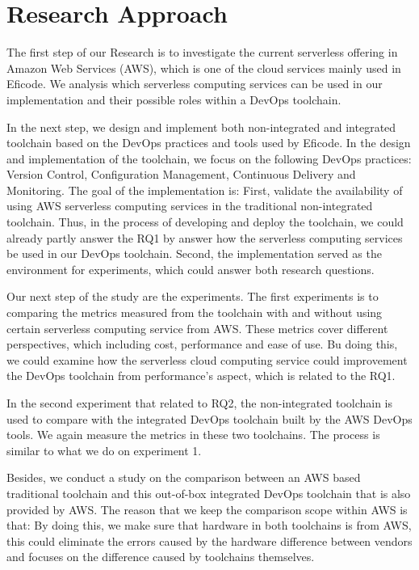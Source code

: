 \section{Research Approach} 
\par
The first step of our Research is to investigate the current serverless offering in Amazon Web Services (AWS), which is one of the cloud services mainly used in Eficode. We analysis which serverless computing services can be used in our implementation and their possible roles within a DevOps toolchain.
\par
In the next step, we design and implement both non-integrated and integrated toolchain based on the DevOps practices and tools used by Eficode. In the design and implementation of the toolchain, we focus on the following DevOps practices: Version Control, Configuration Management, Continuous Delivery and Monitoring. The goal of the implementation is: First, validate the availability of using AWS serverless computing services in the traditional non-integrated toolchain. Thus, in the process of developing and deploy the toolchain, we could already partly answer the RQ1 by answer how the serverless computing services be used in our DevOps toolchain. Second, the implementation served as the environment for experiments, which could answer both research questions. 
\par
Our next step of the study are the experiments.
The first experiments is to comparing the metrics measured from the toolchain with and without using certain serverless computing service from AWS. These metrics cover different perspectives, which including cost, performance and ease of use. Bu doing this, we could examine how the serverless cloud computing service could improvement the DevOps toolchain from performance's aspect, which is related to the RQ1.
\par
In the second experiment that related to RQ2, the non-integrated toolchain is used to compare with the integrated DevOps toolchain built by the AWS DevOps tools. We again measure the metrics in these two toolchains. The process is similar to what we do on experiment 1.
\par
Besides, we conduct a study on the comparison between an AWS based traditional toolchain and this out-of-box integrated DevOps toolchain that is also provided by AWS. The reason that we keep the comparison scope within AWS is that: By doing this, we make sure that hardware in both toolchains is from AWS, this could eliminate the errors caused by the hardware difference between vendors and focuses on the difference caused by toolchains themselves.
